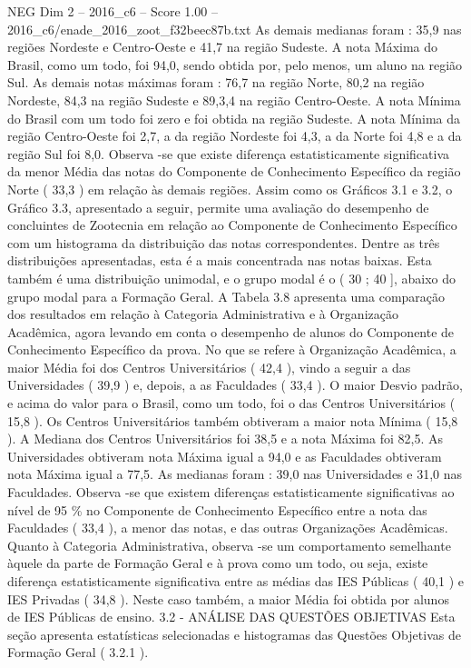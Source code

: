 \begin{textsample}{NEG Dim 2 – 2016\_c6 – Score 1.00 – 2016\_c6/enade\_2016\_zoot\_f32beec87b.txt}
As demais medianas foram : 35,9 nas regiões Nordeste e Centro-Oeste e 41,7 na região Sudeste.
A nota Máxima do Brasil, como um todo, foi 94,0, sendo obtida por, pelo menos, um aluno na região Sul.
As demais notas máximas foram : 76,7 na região Norte, 80,2 na região Nordeste, 84,3 na região Sudeste e 89,3,4 na região Centro-Oeste.
A nota Mínima do Brasil com um todo foi zero e foi obtida na região Sudeste.
A nota Mínima da região Centro-Oeste foi 2,7, a da região Nordeste foi 4,3, a da Norte foi 4,8 e a da região Sul foi 8,0.
Observa -se que existe diferença estatisticamente significativa da menor Média das notas do Componente de Conhecimento Específico da região Norte ( 33,3 ) em relação às demais regiões.
Assim como os Gráficos 3.1 e 3.2, o Gráfico 3.3, apresentado a seguir, permite uma avaliação do desempenho de concluintes de Zootecnia em relação ao Componente de Conhecimento Específico com um histograma da distribuição das notas correspondentes.
Dentre as três distribuições apresentadas, esta é a mais concentrada nas notas baixas.
Esta também é uma distribuição unimodal, e o grupo modal é o ( 30 ; 40 ], abaixo do grupo modal para a Formação Geral.
A Tabela 3.8 apresenta uma comparação dos resultados em relação à Categoria Administrativa e à Organização Acadêmica, agora levando em conta o desempenho de alunos do Componente de Conhecimento Específico da prova.
No que se refere à Organização Acadêmica, a maior Média foi dos Centros Universitários ( 42,4 ), vindo a seguir a das Universidades ( 39,9 ) e, depois, a as Faculdades ( 33,4 ).
O maior Desvio padrão, e acima do valor para o Brasil, como um todo, foi o das Centros Universitários ( 15,8 ).
Os Centros Universitários também obtiveram a maior nota Mínima ( 15,8 ).
A Mediana dos Centros Universitários foi 38,5 e a nota Máxima foi 82,5.
As Universidades obtiveram nota Máxima igual a 94,0 e as Faculdades obtiveram nota Máxima igual a 77,5.
As medianas foram : 39,0 nas Universidades e 31,0 nas Faculdades.
Observa -se que existem diferenças estatisticamente significativas ao nível de 95 \% no Componente de Conhecimento Específico entre a nota das Faculdades ( 33,4 ), a menor das notas, e das outras Organizações Acadêmicas.
Quanto à Categoria Administrativa, observa -se um comportamento semelhante àquele da parte de Formação Geral e à prova como um todo, ou seja, existe diferença estatisticamente significativa entre as médias das IES Públicas ( 40,1 ) e IES Privadas ( 34,8 ).
Neste caso também, a maior Média foi obtida por alunos de IES Públicas de ensino. 3.2 - ANÁLISE DAS QUESTÕES OBJETIVAS Esta seção apresenta estatísticas selecionadas e histogramas das Questões Objetivas de Formação Geral ( 3.2.1 ).

\end{textsample}
